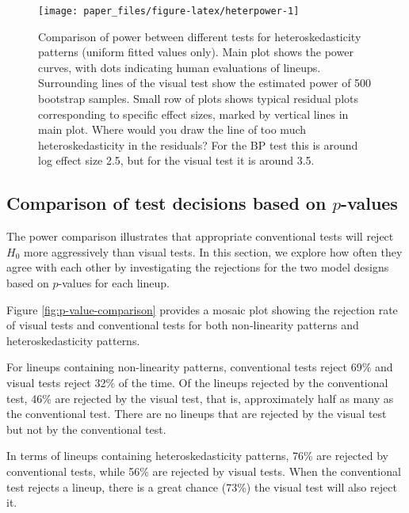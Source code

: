 \documentclass[]{interact}
\theoremstyle{plain}%
\theoremstyle{definition}
\theoremstyle{remark}
\begin{document}
\begin{figure}

{\centering \texttt{[image: paper\_files/figure-latex/heterpower-1]} 

}

\caption{Comparison of power between different tests for heteroskedasticity patterns (uniform fitted values only). Main plot shows the power curves, with dots indicating human evaluations of lineups. Surrounding lines of the visual test show the estimated power of 500 bootstrap samples. Small row of plots shows typical residual plots corresponding to specific effect sizes, marked by vertical lines in main plot. Where would you draw the line of too much heteroskedasticity in the residuals? For the BP test this is around log effect size 2.5, but for the visual test it is around 3.5.}\label{fig:heterpower}
\end{figure}

\hypertarget{comparison-of-test-decisions-based-on-p-values}{%
\subsection{\texorpdfstring{Comparison of test decisions based on
\(p\)-values}{Comparison of test decisions based on p-values}}\label{comparison-of-test-decisions-based-on-p-values}}

The power comparison illustrates that appropriate conventional tests
will reject \(H_0\) more aggressively than visual tests. In this
section, we explore how often they agree with each other by
investigating the rejections for the two model designs based on
\(p\)-values for each lineup.

Figure \ref{fig:p-value-comparison} provides a mosaic plot showing the
rejection rate of visual tests and conventional tests for both
non-linearity patterns and heteroskedasticity patterns.

For lineups containing non-linearity patterns, conventional tests reject
69\% and visual tests reject 32\% of the time. Of the lineups rejected
by the conventional test, 46\% are rejected by the visual test, that is,
approximately half as many as the conventional test. There are no
lineups that are rejected by the visual test but not by the conventional
test.

In terms of lineups containing heteroskedasticity patterns, 76\% are
rejected by conventional tests, while 56\% are rejected by visual tests.
When the conventional test rejects a lineup, there is a great chance
(73\%) the visual test will also reject it.
\end{document}
